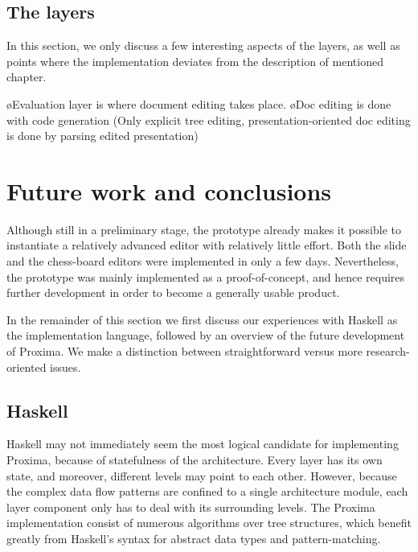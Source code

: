 \bc
\subsection{The layers}
\toHere

In this section, we only discuss a few interesting aspects of the layers, as well as points where the implementation deviates from the description of mentioned chapter.

\bl
\o Evaluation layer is where document editing takes place. 
\o Doc editing is done with code generation (Only explicit tree editing, presentation-oriented doc editing is done by parsing edited presentation)
\el
\ec


\section{Future work and conclusions} \label{sect:protoConcl}

Although still in a preliminary stage, the prototype already makes it possible to instantiate a relatively advanced editor with relatively little effort. Both the slide and the chess-board editors were implemented in only a few days. Nevertheless, the prototype was mainly implemented as a proof-of-concept, and hence requires further development in order to become a generally usable product.

In the remainder of this section we first discuss our experiences with Haskell as the implementation language, followed by an overview of the future development of Proxima. We make a distinction between straightforward versus more research-oriented  issues.

\subsection{Haskell}

Haskell may not immediately seem the most logical candidate for implementing Proxima, because of statefulness of the architecture. Every layer has its own state, and moreover, different levels may point to each other. However, because  the complex data flow patterns are confined to a single architecture module, each layer component only has to deal with its surrounding levels. The Proxima implementation consist of numerous algorithms over tree structures, which benefit greatly from Haskell's syntax for abstract data types and pattern-matching. 

